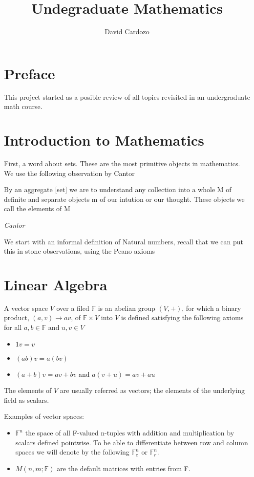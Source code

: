 \documentclass[11pt,twoside]{book}
\title{Undegraduate Mathematics}
\author{David Cardozo}
\begin{document}
\maketitle
\chapter{Preface}
This project started as a posible review of all topics revisited in an undergraduate math course.

\mainmatter
\chapter{Introduction to Mathematics}
First, a word about sets. These are the most primitive objects in mathematics. We use the following observation by Cantor

\epigraph{By an aggregate [set] we are to understand any collection into a whole M of definite and separate objects m of our intution or our thought. These objects we call the elements of M}{\textit{Cantor}}

We start with an informal definition of Natural numbers, recall that we can put this in stone observations, using the Peano axioms

\chapter{Linear Algebra}

A vector space $V$ over a filed $\mathbb{F}$ is an abelian group $(V,+)$, for which a binary product, $(a,v) \rightarrow av$, of $ \mathbb{F} \times V$ into $V$ is defined satisfying the following axioms for all $a,b \in \mathbb{F}$ and $u,v \in V$

\begin{itemize}
    \item $1v = v$
    \item $(ab)v = a(bv) $
    \item $(a + b)v = av + bv$ and $a(v+u) = av + au$
\end{itemize}

The elements of $V$ are usually referred as vectors; the elements of the underlying field as scalars.

Examples of vector spaces:

\begin{itemize}
	\item $\mathbb{F}^n $ the space of all F-valued n-tuples with addition and multiplication by scalars defined pointwise. To be able to differentiate between row and column spaces we will denote by the following $\mathbb{F}_c^n$ or $\mathbb{F}_r^n$.
	\item $M(n,m;\mathbb{F})$ are the default matrices with entries from F. 
\end{itemize}
\end{document}
